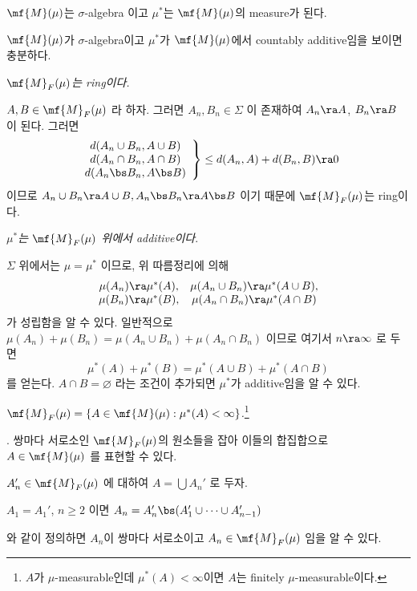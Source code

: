  \(\mf{M}(\mu)\)는 \(\sigma\)-algebra 이고 \(\mu^\ast\)는 \(\mf{M}(\mu)\)의 measure가 된다.

\pf \(\mf{M}(\mu)\)가 \(\sigma\)-algebra이고 \(\mu^\ast\)가 \(\mf{M}(\mu)\)에서 countably additive임을 보이면 충분하다.

 \textit{\(\mf{M}_F(\mu)\)는 ring이다.}

\(A, B \in \mf{M}_F(\mu)\) 라 하자. 그러면 \(A_n, B_n \in \Sigma\) 이 존재하여 \(A_n \ra A\), \(B_n \ra B\) 이 된다. 그러면
\[
    \left.\begin{array}{c}d(A_n \cup B_n, A \cup B) \\ d(A_n \cap B_n, A \cap B) \\ d(A_n \bs B_n, A \bs B)\end{array}\right\}
    \leq d(A_n, A) + d(B_n, B) \ra 0
\]
이므로 \(A_n \cup B_n \ra A \cup B, A_n \bs B_n \ra A\bs B\) 이기 때문에 \(\mf{M}_F(\mu)\)는 ring이다.

 \textit{\(\mu^\ast\)는 \(\mf{M}_F(\mu)\) 위에서 additive이다}.

\(\Sigma\) 위에서는 \(\mu = \mu^\ast\) 이므로, 위 따름정리에 의해
\[
    \begin{matrix}
        \mu(A_n) \ra \mu^\ast(A), & \mu(A_n\cup B_n) \ra \mu^\ast(A\cup B), \\
        \mu(B_n) \ra \mu^\ast(B), & \mu(A_n\cap B_n) \ra \mu^\ast(A\cap B)
    \end{matrix}
\]
가 성립함을 알 수 있다. 일반적으로 \(\mu(A_n) + \mu(B_n) = \mu(A_n \cup B_n) + \mu(A_n \cap B_n)\) 이므로 여기서 \(n \ra \infty\) 로 두면
\[
    \mu^\ast(A) + \mu^\ast(B) = \mu^\ast(A\cup B) + \mu^\ast(A \cap B)
\]
를 얻는다. \(A \cap B = \varnothing\) 라는 조건이 추가되면 \(\mu^\ast\)가 additive임을 알 수 있다.

 \textit{\(\mf{M}_F(\mu) = \{A \in \mf{M}(\mu) : \mu^\ast(A) < \infty\}\).}\footnote{\(A\)가 \(\mu\)-measurable인데 \(\mu^\ast(A) < \infty\)이면 \(A\)는 finitely \(\mu\)-measurable이다.}

\quad \claim. 쌍마다 서로소인 \(\mf{M}_F(\mu)\)의 원소들을 잡아 이들의 합집합으로 \(A \in \mf{M}(\mu)\) 를 표현할 수 있다.

\quad \pf \(A_n' \in \mf{M}_F(\mu)\) 에 대하여 \(A = \bigcup A_n'\) 로 두자.
\begin{center}
    \(A_1 = A_1'\), \(n \geq 2\) 이면 \(A_n = A_n' \bs (A_1'\cup \cdots \cup A_{n-1}')\)
\end{center}
와 같이 정의하면 \(A_n\)이 쌍마다 서로소이고 \(A_n \in \mf{M}_F(\mu)\) 임을 알 수 있다.


